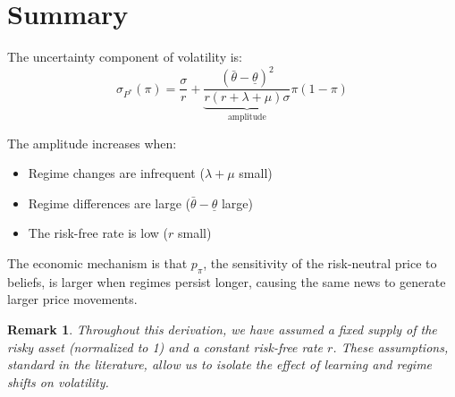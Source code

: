 \documentclass[12pt]{article}
\newtheorem{remark}{Remark}
\begin{document}
\section{Summary}

The uncertainty component of volatility is:
\begin{equation}
\sigma_{P^*}(\pi) = \frac{\sigma}{r} + \underbrace{\frac{(\bar{\theta} - \underline{\theta})^2}{r(r + \lambda + \mu)\sigma}}_{\text{amplitude}} \pi(1-\pi)
\end{equation}

The amplitude increases when:
\begin{itemize}
    \item Regime changes are infrequent ($\lambda + \mu$ small)
    \item Regime differences are large ($\bar{\theta} - \underline{\theta}$ large)
    \item The risk-free rate is low ($r$ small)
\end{itemize}

The economic mechanism is that $p_\pi$, the sensitivity of the risk-neutral price to beliefs, is larger when regimes persist longer, causing the same news to generate larger price movements.

\begin{remark}
Throughout this derivation, we have assumed a fixed supply of the risky asset (normalized to 1) and a constant risk-free rate $r$. These assumptions, standard in the literature, allow us to isolate the effect of learning and regime shifts on volatility.
\end{remark}
\end{document}
